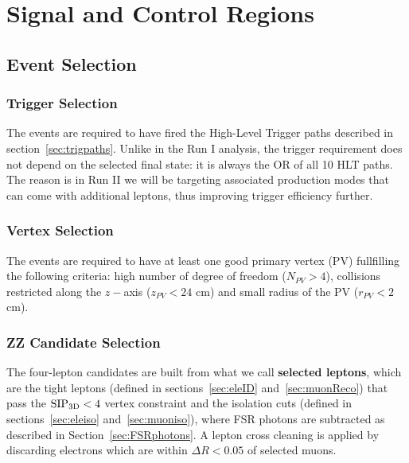 \chapter{Signal and Control Regions}

\section{Event Selection}

\subsection{Trigger Selection}
\label{sec:HLTsel}

The events are required to have fired the High-Level Trigger paths described in section~\ref{sec:trigpaths}. Unlike in the Run I analysis, the trigger requirement does not depend on the selected final state: it is always the OR of all 10 HLT paths. The reason is in Run II we will be targeting associated production modes that can come with additional leptons, thus improving trigger efficiency further.


\subsection{Vertex Selection}
\label{sec:vertexsel}

The events are required to have at least one good primary
vertex (PV) fullfilling the following criteria: high number of degree
of freedom ($N_{PV}>4$), collisions restricted along the $z-$axis
($z_{PV}<24$ cm) and small radius of the PV ($r_{PV}<2$ cm).


\subsection{ZZ Candidate Selection}
\label{sec:zzcandsel}

The four-lepton candidates are built from what we call {\bf selected leptons}, which  
are the tight leptons (defined in sections~\ref{sec:eleID} and~\ref{sec:muonReco}) that pass the ${\rm SIP_{3D}} < 4$ vertex constraint
and the isolation cuts (defined in sections~\ref{sec:eleiso} and~\ref{sec:muoniso}), 
where FSR photons are subtracted as described in Section~\ref{sec:FSRphotons}.
A lepton cross cleaning is applied 
by discarding electrons which are within $\Delta R < 0.05$ of selected muons. 


